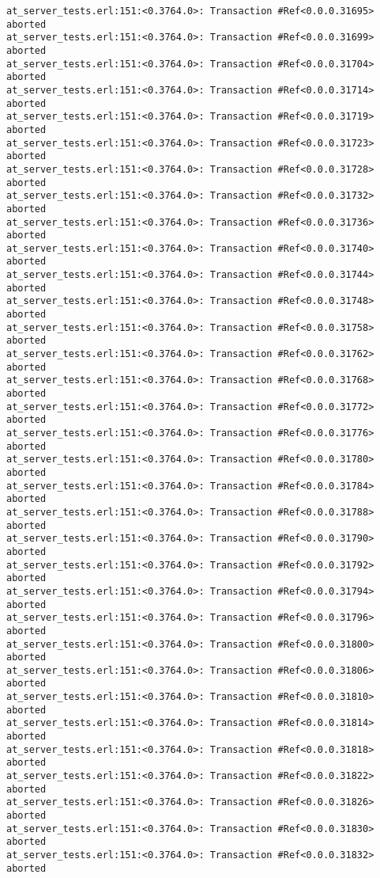 \documentclass[
paper=a4,
oneside,
fontsize=11pt,
numbers=noenddot,
headinclude=false, %
footinclude=false, %
fleqn,             %
DIV=8
]{scrartcl}
\begin{document}
\begin{lstlisting}[caption=Session output: {\tt
    commit\_t\_competing\_test()} (debug enabled),
  label=lst:testoutcommit, basicstyle=\ttfamily\scriptsize]
at_server_tests.erl:151:<0.3764.0>: Transaction #Ref<0.0.0.31695> aborted
at_server_tests.erl:151:<0.3764.0>: Transaction #Ref<0.0.0.31699> aborted
at_server_tests.erl:151:<0.3764.0>: Transaction #Ref<0.0.0.31704> aborted
at_server_tests.erl:151:<0.3764.0>: Transaction #Ref<0.0.0.31714> aborted
at_server_tests.erl:151:<0.3764.0>: Transaction #Ref<0.0.0.31719> aborted
at_server_tests.erl:151:<0.3764.0>: Transaction #Ref<0.0.0.31723> aborted
at_server_tests.erl:151:<0.3764.0>: Transaction #Ref<0.0.0.31728> aborted
at_server_tests.erl:151:<0.3764.0>: Transaction #Ref<0.0.0.31732> aborted
at_server_tests.erl:151:<0.3764.0>: Transaction #Ref<0.0.0.31736> aborted
at_server_tests.erl:151:<0.3764.0>: Transaction #Ref<0.0.0.31740> aborted
at_server_tests.erl:151:<0.3764.0>: Transaction #Ref<0.0.0.31744> aborted
at_server_tests.erl:151:<0.3764.0>: Transaction #Ref<0.0.0.31748> aborted
at_server_tests.erl:151:<0.3764.0>: Transaction #Ref<0.0.0.31758> aborted
at_server_tests.erl:151:<0.3764.0>: Transaction #Ref<0.0.0.31762> aborted
at_server_tests.erl:151:<0.3764.0>: Transaction #Ref<0.0.0.31768> aborted
at_server_tests.erl:151:<0.3764.0>: Transaction #Ref<0.0.0.31772> aborted
at_server_tests.erl:151:<0.3764.0>: Transaction #Ref<0.0.0.31776> aborted
at_server_tests.erl:151:<0.3764.0>: Transaction #Ref<0.0.0.31780> aborted
at_server_tests.erl:151:<0.3764.0>: Transaction #Ref<0.0.0.31784> aborted
at_server_tests.erl:151:<0.3764.0>: Transaction #Ref<0.0.0.31788> aborted
at_server_tests.erl:151:<0.3764.0>: Transaction #Ref<0.0.0.31790> aborted
at_server_tests.erl:151:<0.3764.0>: Transaction #Ref<0.0.0.31792> aborted
at_server_tests.erl:151:<0.3764.0>: Transaction #Ref<0.0.0.31794> aborted
at_server_tests.erl:151:<0.3764.0>: Transaction #Ref<0.0.0.31796> aborted
at_server_tests.erl:151:<0.3764.0>: Transaction #Ref<0.0.0.31800> aborted
at_server_tests.erl:151:<0.3764.0>: Transaction #Ref<0.0.0.31806> aborted
at_server_tests.erl:151:<0.3764.0>: Transaction #Ref<0.0.0.31810> aborted
at_server_tests.erl:151:<0.3764.0>: Transaction #Ref<0.0.0.31814> aborted
at_server_tests.erl:151:<0.3764.0>: Transaction #Ref<0.0.0.31818> aborted
at_server_tests.erl:151:<0.3764.0>: Transaction #Ref<0.0.0.31822> aborted
at_server_tests.erl:151:<0.3764.0>: Transaction #Ref<0.0.0.31826> aborted
at_server_tests.erl:151:<0.3764.0>: Transaction #Ref<0.0.0.31830> aborted
at_server_tests.erl:151:<0.3764.0>: Transaction #Ref<0.0.0.31832> aborted

\end{lstlisting}
\end{document}

